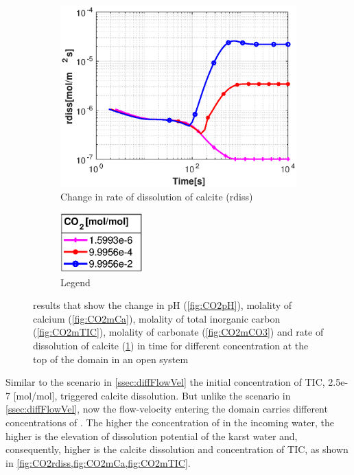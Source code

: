 \begin{figure}[!h]
\begin{subfigure}{.5\linewidth}
            \centering
        \includegraphics[width=\textwidth]{PICTURES/with_CO2_rdiss.eps}
        \caption{Change in rate of dissolution of calcite (rdiss)}
        \label{fig:CO2rdiss}
    \end{subfigure}%
    \hfill
    \begin{subfigure}{.5\linewidth}
            \centering
        \includegraphics[width=0.35\textwidth]{PICTURES/with_CO2_legend.eps}
        \caption{Legend}
        \label{fig:CO2legend}
    \end{subfigure}%
    \caption{\DuMuX results that show the change in pH (\cref{fig:CO2pH}), molality of calcium (\cref{fig:CO2mCa}), 
    molality of total inorganic carbon (\cref{fig:CO2mTIC}), molality of carbonate (\cref{fig:CO2mCO3}) and rate of 
    dissolution of calcite (\cref{fig:CO2rdiss}) in time for different  concentration at the top of the domain in an open system}
    \label{fig:diffCO2}
\end{figure}

Similar to the scenario in \cref{ssec:diffFlowVel} the initial concentration of TIC, 2.5e-7 [mol/mol], triggered calcite dissolution. 
But unlike the scenario in \cref{ssec:diffFlowVel}, now the flow-velocity entering the domain carries different concentrations of . 
The higher the concentration of  in the incoming water, the higher is the elevation of dissolution potential of the karst water and, consequently, higher is 
the calcite dissolution and concentration of TIC, as shown in \cref{fig:CO2rdiss,fig:CO2mCa,fig:CO2mTIC}. \\


